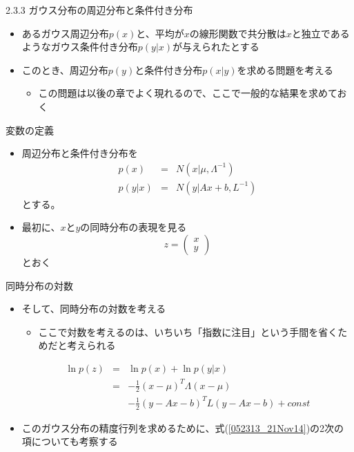 \begin{frame}{2.3.3 ガウス分布の周辺分布と条件付き分布}
 \begin{itemize}
  \item あるガウス周辺分布$p(x)$と、平均が$x$の線形関数で共分散は$x$と独立であるようなガウス条件付き分布$p(y|x)$が与えられたとする
  \item このとき、周辺分布$p(y)$と条件付き分布$p(x|y)$を求める問題を考える
        \begin{itemize}
         \item この問題は以後の章でよく現れるので、ここで一般的な結果を求めておく
        \end{itemize}
 \end{itemize}
\end{frame}

\begin{frame}{変数の定義}
 \begin{itemize}
  \item 周辺分布と条件付き分布を
        \begin{eqnarray}
         p(x) &=& N(x|\mu , \Lambda^{-1})\\
         p(y|x) &=& N(y|Ax+b, L^{-1})
        \end{eqnarray}
        とする。
  \item 最初に、$x$と$y$の同時分布の表現を見る
        \begin{equation}
         z = \begin{pmatrix}
              x \\
              y
             \end{pmatrix}
        \end{equation}
        とおく
 \end{itemize}
\end{frame}

\begin{frame}{同時分布の対数}
 \begin{itemize}
  \item そして、同時分布の対数を考える
  \begin{itemize}
   \item ここで対数を考えるのは、いちいち「指数に注目」という手間を省くためだと考えられる
  \end{itemize}
        \begin{eqnarray}
         \ln p(z) &=& \ln p(x) + \ln p(y|x) \nonumber \\
         &= & -\frac{1}{2}(x-\mu)^T\Lambda(x-\mu) \nonumber \\
         &&-\frac{1}{2}(y-Ax-b)^TL(y-Ax-b)+const\label{052313_21Nov14}
        \end{eqnarray}
  \item このガウス分布の精度行列を求めるために、式(\ref{052313_21Nov14})の2次の項についても考察する
 \end{itemize}
\end{frame}

